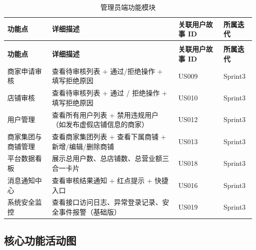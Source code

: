 \begin{longtable}{>{\centering\arraybackslash}m{3cm} >{\centering\arraybackslash}m{6.5cm} >{\centering\arraybackslash}m{2cm} >{\centering\arraybackslash}m{2cm}}

    \caption{管理员端功能模块} \label{tab:training}                                             \\

    \toprule
    \textbf{功能点} & \textbf{详细描述}                   & \textbf{关联用户故事 ID} & \textbf{所属迭代} \\
    \midrule
    \endfirsthead

    \multicolumn{4}{c}{{\tablename\ \thetable{} 续表}}                                    \\
    \toprule
    \textbf{功能点} & \textbf{详细描述}                   & \textbf{关联用户故事 ID} & \textbf{所属迭代} \\
    \midrule
    \endhead

    \bottomrule
    \endfoot


    商家申请审核       & 查看待审核列表 + 通过/拒绝操作 + 填写拒绝原因      & US009              & Sprint3       \\
    店铺审核         & 查看待审核列表 + 通过 / 拒绝操作 + 填写拒绝原因    & US010              & Sprint3       \\
    用户管理         & 查看所有用户列表 + 禁用违规用户（如发布虚假店铺信息的商家） & US012              & Sprint3       \\
    商家集团与商铺管理    & 查看商家集团列表 + 查看下属商铺 + 新增/编辑/删除商铺  & US013              & Sprint3       \\
    平台数据看板       & 展示总用户数、总店铺数、总营业额三合一卡片           & US018              & Sprint3       \\
    消息通知中心       & 查看审核结果通知 + 红点提示 + 快捷入口          & US016              & Sprint3       \\
    系统安全监控       & 查看接口访问日志、异常登录记录、安全事件报警（基础版）     & US019              & Sprint3       \\
\end{longtable}

\newpage

\subsection{核心功能活动图}

